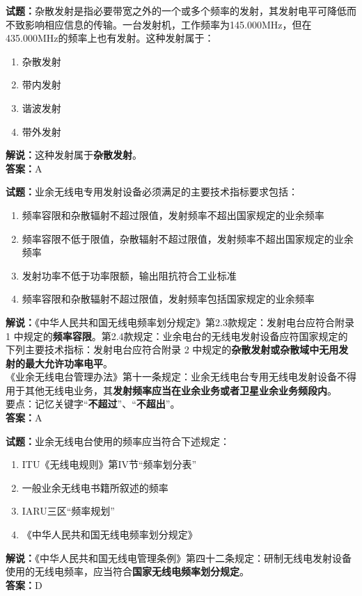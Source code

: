 \documentclass{ctexbook}
\begin{document}
\bigskip


\noindent\textbf{试题：}杂散发射是指必要带宽之外的一个或多个频率的发射，其发射电平可降低而不致影响相应信息的传输。一台发射机，工作频率为145.000\unit{\MHz}，但在435.000\unit{\MHz}的频率上也有发射。这种发射属于：
\begin{enumerate}[leftmargin=3em]
\item 杂散发射
\item 带内发射
\item 谐波发射
\item 带外发射
\end{enumerate}
\noindent\textbf{解说：}这种发射属于\textbf{杂散发射}。\\\noindent\textbf{答案：}A




\bigskip


\noindent\textbf{试题：}业余无线电专用发射设备必须满足的主要技术指标要求包括：
\begin{enumerate}[leftmargin=3em]
\item 频率容限和杂散辐射不超过限值，发射频率不超出国家规定的业余频率
\item 频率容限不低于限值，杂散辐射不超过限值，发射频率不超出国家规定的业余频率
\item 发射功率不低于功率限额，输出阻抗符合工业标准
\item 频率容限和杂散辐射不超过限值，发射频率包括国家规定的业余频率
\end{enumerate}
\noindent\textbf{解说：}《中华人民共和国无线电频率划分规定》第2.3款规定：发射电台应符合附录 1 中规定的\textbf{频率容限}。第2.4款规定：业余电台的无线电发射设备应符国家规定的下列主要技术指标：发射电台应符合附录 2 中规定的\textbf{杂散发射或杂散域中无用发射的最大允许功率电平}。\\《业余无线电台管理办法》第十一条规定：业余无线电台专用无线电发射设备不得用于其他无线电业务，其\textbf{发射频率应当在业余业务或者卫星业余业务频段内}。\\要点：记忆关键字“\textbf{不超过}”、“\textbf{不超出}”。\\\noindent\textbf{答案：}A

\bigskip


\noindent\textbf{试题：}业余无线电台使用的频率应当符合下述规定：
\begin{enumerate}[leftmargin=3em]
\item ITU《无线电规则》第IV节“频率划分表”
\item 一般业余无线电书籍所叙述的频率
\item IARU三区“频率规划”
\item 《中华人民共和国无线电频率划分规定》
\end{enumerate}
\noindent\textbf{解说：}《中华人民共和国无线电管理条例》第四十二条规定：研制无线电发射设备使用的无线电频率，应当符合\textbf{国家无线电频率划分规定}。\\\noindent\textbf{答案：}D
\end{document}
